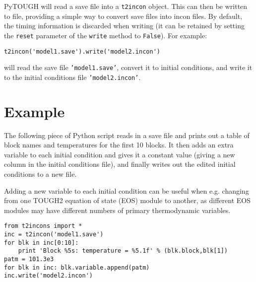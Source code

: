 PyTOUGH will read a save file into a \texttt{t2incon} object.  This can then be written to file, providing a simple way to convert save files into incon files.  By default, the timing information is discarded when writing (it can be retained by setting the \texttt{reset} parameter of the \texttt{write} method to \texttt{False}).  For example:

\begin{lstlisting}
t2incon('model1.save').write('model2.incon')
\end{lstlisting}

will read the save file \texttt{'model1.save'}, convert it to initial conditions, and write it to the initial conditions file \texttt{'model2.incon'}.

\section{Example}

The following piece of Python script reads in a save file and prints out a table of block names and temperatures for the first 10 blocks.  It then adds an extra variable to each initial condition and gives it a constant value (giving a new column in the initial conditions file), and finally writes out the edited initial conditions to a new file.

Adding a new variable to each initial condition can be useful when e.g. changing from one TOUGH2 equation of state (EOS) module to another, as different EOS modules may have different numbers of primary thermodynamic variables.

\begin{lstlisting}
from t2incons import *
inc = t2incon('model1.save')
for blk in inc[0:10]:
    print 'Block %5s: temperature = %5.1f' % (blk.block,blk[1])
patm = 101.3e3
for blk in inc: blk.variable.append(patm)
inc.write('model2.incon')
\end{lstlisting}

